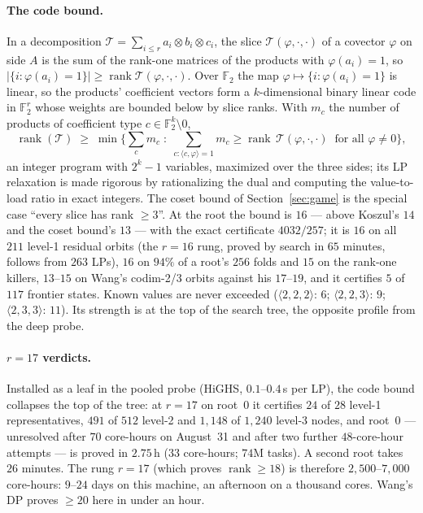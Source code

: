 \documentclass[11pt]{article}
\theoremstyle{definition}
\newcommand{\F}{\mathbb{F}_2}
\newcommand{\T}{\mathcal{T}}
\newcommand{\rk}{\operatorname{rank}}
\begin{document}
\paragraph{The code bound.} In a decomposition $\T=\sum_{i\le r} a_i\otimes
b_i\otimes c_i$, the slice $\T(\varphi,\cdot,\cdot)$ of a covector $\varphi$
on side $A$ is the sum of the rank-one matrices of the products with
$\varphi(a_i)=1$, so $|\{i:\varphi(a_i)=1\}|\ge \rk \T(\varphi,\cdot,\cdot)$.
Over $\F$ the map $\varphi\mapsto\{i:\varphi(a_i)=1\}$ is linear, so the
products' coefficient vectors form a $k$-dimensional binary linear code in
$\F^r$ whose weights are bounded below by slice ranks. With $m_c$ the
number of products of coefficient type $c\in\F^k\setminus 0$,
\[
\rk(\T)\;\ge\;\min\Big\{\sum_c m_c \;:\; \sum_{c:\langle c,\varphi\rangle=1} m_c
\ge \rk\,\T(\varphi,\cdot,\cdot)\ \text{ for all } \varphi\ne 0\Big\},
\]
an integer program with $2^k-1$ variables, maximized over the three sides;
its LP relaxation is made rigorous by rationalizing the dual and computing
the value-to-load ratio in exact integers. The coset bound of
Section~\ref{sec:game} is the special case ``every slice has rank $\ge 3$''.
At the root the bound is $16$ --- above Koszul's $14$ and the coset bound's
$13$ --- with the exact certificate $4032/257$; it is $16$ on all $211$
level-1 residual orbits (the $r=16$ rung, proved by search in $65$ minutes,
follows from $263$ LPs), $16$ on $94\%$ of a root's $256$ folds and $15$ on
the rank-one killers, $13$--$15$ on Wang's codim-2/3 orbits against his
$17$--$19$, and it certifies $5$ of $117$ frontier states. Known values are
never exceeded ($\langle2,2,2\rangle$: $6$; $\langle2,2,3\rangle$: $9$;
$\langle2,3,3\rangle$: $11$). Its strength is at the top of the search tree,
the opposite profile from the deep probe.

\paragraph{$r=17$ verdicts.} Installed as a leaf in the pooled probe
(HiGHS, $0.1$--$0.4$\,s per LP), the code bound collapses the top of the
tree: at $r=17$ on root~$0$ it certifies $24$ of $28$ level-1
representatives, $491$ of $512$ level-2 and $1{,}148$ of $1{,}240$ level-3
nodes, and root~$0$ --- unresolved after $70$ core-hours on August~31 and
after two further $48$-core-hour attempts --- is proved in $2.75$\,h
($33$ core-hours; $74$M tasks). A second root takes $26$ minutes. The
rung $r=17$ (which proves $\rk\ge 18$) is therefore $2{,}500$--$7{,}000$
core-hours: $9$--$24$ days on this machine, an afternoon on a thousand
cores. Wang's DP proves $\ge 20$ here in under an hour.
\end{document}
